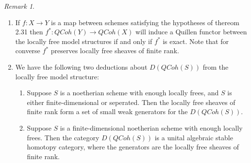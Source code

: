 \documentclass{article}
\theoremstyle{definition}
\theoremstyle{remark}
\newtheorem{remark}[theorem]{Remark}
\begin{document}
\begin{remark}
\begin{enumerate}
    \item If $f:X \rightarrow Y$ is a map  between schemes satisfying the hypotheses of thereom 2.31 then $f^{*}: QCoh(Y) \rightarrow QCoh(X)$ will induce a Quillen functor between the locally free model structures if and only if $f^{*}$ is exact. Note that for converse $f^{*}$ preserves locally free sheaves of finite rank.
    
    \item We have the following two deductions about $D(QCoh(S))$ from the locally free model structure: 
    \begin{enumerate}
        \item \cite[corollary 2.5]{MR1814077} Suppose $S$ is a noetherian scheme with enough locally frees, and $S$ is either finite-dimensional or seperated. Then the locally free sheaves of finite rank form a set of small weak generators for the $D(QCoh(S))$.
        \item \cite[corollary 2.6]{MR1814077} Suppose $S$ is a finite-dimensional noetherian scheme with enough locally frees. Then the category $D(QCoh(S))$ is a unital algebraic stable homotopy category, where the generators are the locally free sheaves of finite rank.             
    \end{enumerate}  
\end{enumerate}

\end{remark}
\end{document}
